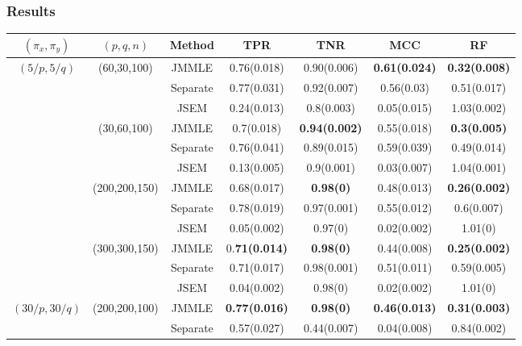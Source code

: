 \documentclass[10pt]{beamer}
\theoremstyle{definition}
\begin{document}
\begin{frame}
\frametitle{Results}

\begin{scriptsize}
\begin{tabular}{ccccccc}
    \hline
    $(\pi_x, \pi_y)$ & $(p,q,n)$   & Method   & TPR            & TNR             & MCC & RF            \\ \hline
    $(5/p, 5/q)$   & (60,30,100)   & JMMLE    & 0.76(0.018) & 0.90(0.006)  & \textbf{0.61(0.024)}  & \textbf{0.32(0.008)} \\
    ~              & ~             & Separate & 0.77(0.031) & 0.92(0.007)  & 0.56(0.03)   & 0.51(0.017) \\
    ~              & ~             & JSEM     & 0.24(0.013) & 0.8(0.003)   & 0.05(0.015)  & 1.03(0.002)\\\cline{2-7}
    ~              & (30,60,100)   & JMMLE    & 0.7(0.018)  & \textbf{0.94(0.002)}  & 0.55(0.018)  & \textbf{0.3(0.005)} \\
    ~              & ~             & Separate & 0.76(0.041) & 0.89(0.015)  & 0.59(0.039)  & 0.49(0.014) \\
    ~              & ~             & JSEM     & 0.13(0.005) & 0.9(0.001)   & 0.03(0.007)  & 1.04(0.001) \\\cline{2-7}
    ~              & (200,200,150) & JMMLE    & 0.68(0.017) & \textbf{0.98(0)}      & 0.48(0.013)  & \textbf{0.26(0.002)} \\
    ~              & ~             & Separate & 0.78(0.019) & 0.97(0.001)  & 0.55(0.012)  & 0.6(0.007) \\
    ~              & ~             & JSEM     & 0.05(0.002) & 0.97(0)      & 0.02(0.002)  & 1.01(0) \\\cline{2-7}
    ~              & (300,300,150) & JMMLE    & 0.\textbf{71(0.014)} & \textbf{0.98(0)}      & 0.44(0.008)  & \textbf{0.25(0.002) }\\
    ~              & ~             & Separate & 0.71(0.017) & 0.98(0.001)  & 0.51(0.011)  & 0.59(0.005) \\
    ~              & ~             & JSEM     & 0.04(0.002) & 0.98(0)      & 0.02(0.002)  & 1.01(0)     \\\hline
    $(30/p, 30/q)$ & (200,200,100) & JMMLE    & \textbf{0.77(0.016)} & \textbf{0.98(0)}      & \textbf{0.46(0.013)}  & \textbf{0.31(0.003)} \\
    ~              & ~             & Separate & 0.57(0.027) & 0.44(0.007)  & 0.04(0.008)  & 0.84(0.002)\\

\end{tabular}
\end{scriptsize}
\end{frame}
\end{document}
